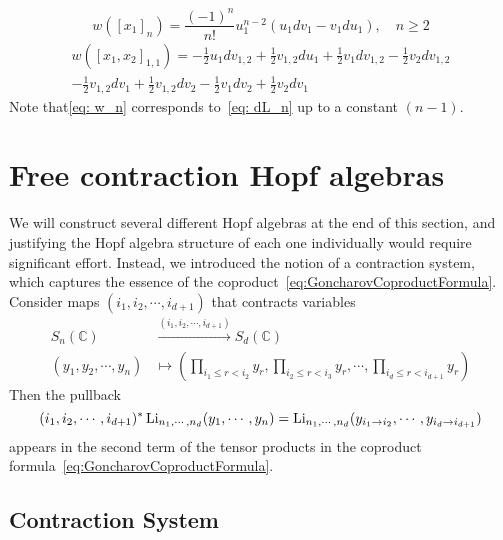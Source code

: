 \begin{example}
\begin{equation}\label{eq: w_n}
w([x_1]_n)=\frac{(-1)^n}{n!}u_1^{n-2}(u_1dv_1-v_1du_1),\quad n\geq2
\end{equation}
\begin{multline}
w([x_1,x_2]_{1,1})=-\frac{1}{2} u_1 dv_{1,2}+\frac{1}{2} v_{1,2} du_1+\frac{1}{2} v_1 dv_{1,2}-\frac{1}{2} v_2 dv_{1,2}\\
-\frac{1}{2}
   v_{1,2} dv_1+\frac{1}{2} v_{1,2} dv_2-\frac{1}{2} v_1 dv_2+\frac{1}{2} v_2 dv_1
\end{multline}
Note that\eqref{eq: w_n} corresponds to~\eqref{eq: dL_n} up to a constant $(n-1)$.
\end{example}

\section{Free contraction Hopf algebras}

We will construct several different Hopf algebras at the end of this section, and justifying the Hopf algebra structure of each one individually would require significant effort. Instead, we introduced the notion of a contraction system, which captures the essence of the coproduct~\ref{eq:GoncharovCoproductFormula}. Consider maps $(i_1,i_2,\cdots,i_{d+1})$ that contracts variables
\begin{equation}
\begin{aligned}
S_n(\mathbb C)&\xrightarrow{(i_1,i_2,\cdots,i_{d+1})} S_d(\mathbb C)\\
(y_1,y_2,\cdots,y_n)&\mapsto\textstyle\left(\prod\limits_{i_1\leq r<i_2}y_r,\prod\limits_{i_2\leq r<i_3}y_r,\cdots,\prod\limits_{i_d\leq r<i_{d+1}}y_r\right)
\end{aligned}
\end{equation}
Then the pullback
\begin{equation}\label{eq: contraction property on multiple polylog}
(i_1,i_2,\cdots,i_{d+1})^*\operatorname{Li}_{n_1,\cdots,n_d}(y_1,\cdots,y_n)=\operatorname{Li}_{n_1,\cdots,n_d}(y_{i_1\to i_2},\cdots,y_{i_d\to i_{d+1}})
\end{equation}
appears in the second term of the tensor products in the coproduct formula~\ref{eq:GoncharovCoproductFormula}.

\subsection{Contraction System}

